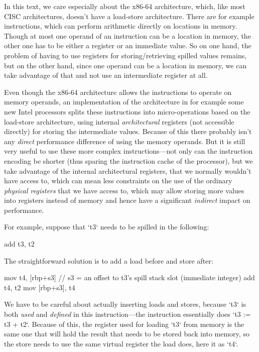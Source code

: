 In this text, we care especially about the x86-64 architecture, which, like most
CISC architectures, doesn't have a load-store architecture. There are
for example instructions, which can perform arithmetic directly on locations in memory.
Though at most one operand of an instruction can be a location in memory, the
other one has to be either a register or an immediate value. So on one hand, the
problem of having to use registers for storing/retrieving spilled values
remains, but on the other hand, since one operand can be a location in memory,
we can take advantage of that and not use an intermediate register at all.

Even though the x86-64 architecture allows
the instructions to operate on memory operands, an implementation of the
architecture in for example some new Intel processors splits these instructions
into micro-operations based on the load-store architecture, using internal
{\em architectural} registers (not accessible directly) for storing the
intermediate values. Because of this there probably isn't any {\em direct}
performance difference of using the memory operands. But it is still very useful
to use these more complex instructions---not only can the instruction encoding
be shorter (thus sparing the instruction cache of the processor), but we take
advantage of the internal architectural registers, that we normally wouldn't
have access to, which can mean less constraints on the use of the ordinary
{\em physical registers} that we have access to, which may allow storing more
values into registers instead of memory and hence have a significant {\em
indirect} impact on performance.

For example, suppose that `t3` needs to be spilled in the following:

\begtt
add t3, t2
\endtt

The straightforward solution is to add a load before and store after:

\begtt
mov t4, [rbp+s3] // s3 = an offset to t3's spill stack slot (immediate integer)
add t4, t2
mov [rbp+s3], t4
\endtt

We have to be careful about actually inserting loads and stores, because `t3` is
both {\em used} and {\em defined} in this instruction---the instruction
essentially does `t3 := t3 + t2`. Because of this, the register used for loading
`t3` from memory is the same one that will hold the result that needs to be
stored back into memory, so the store needs to use the same virtual register
the load does, here it as `t4`.

